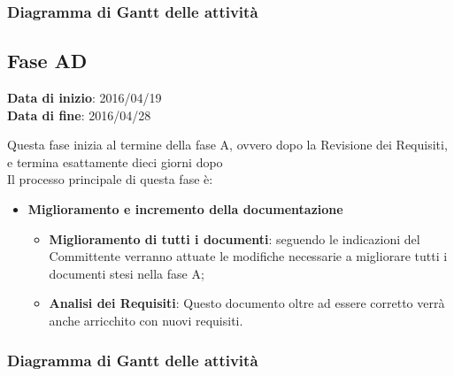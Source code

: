 		
		\subsubsection{Diagramma di Gantt delle attività}
		
		\begin{comment}
		\begin{figure}[h]
			\centering
			\texttt{[image: img/A.png]} 
			\caption{Diagramma di Gantt - Fase A}
		\end{figure}
		\end{comment}
		
		
	\subsection{Fase AD}
	\begin{center}
		\textbf{Data di inizio}: 2016/04/19 \\
		\textbf{Data di fine}: 2016/04/28 \\
	\end{center}
	Questa fase inizia al termine della fase A, ovvero dopo la Revisione dei Requisiti, e termina esattamente dieci giorni dopo \\ 
	Il processo principale di questa fase è:
	\begin{itemize}
		\item \textbf{Miglioramento e incremento della documentazione}
		\att
		\begin{itemize}
			\item \textbf{Miglioramento di tutti i documenti}: seguendo le indicazioni del Committente verranno attuate le modifiche necessarie a migliorare tutti i documenti stesi nella fase A;
			\item \textbf{Analisi dei Requisiti}: Questo documento oltre ad essere corretto verrà anche arricchito con nuovi requisiti.
		\end{itemize}
	\end{itemize}
		
		
		\subsubsection{Diagramma di Gantt delle attività}
		
		
